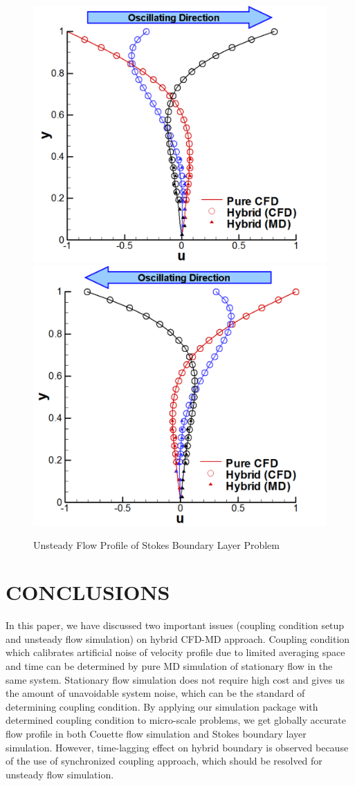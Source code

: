 \documentclass{CFD2010paper}
\begin{document}
%
\begin{figure}[ht]
\centering
\includegraphics[width=0.4\linewidth]{Stokes_Sol_1.pdf}
\hskip 1cm
\includegraphics[width=0.4\linewidth]{Stokes_Sol_2.pdf}
\vskip-0.2cm
\caption{Unsteady Flow Profile of Stokes Boundary Layer Problem}
\label{Stokes_Sol}
\end{figure}



\section{CONCLUSIONS}

In this paper, we have discussed two important issues (coupling condition setup and unsteady flow simulation) on hybrid CFD-MD approach. Coupling condition which calibrates artificial noise of velocity profile due to limited averaging space and time can be determined by pure MD simulation of stationary flow in the same system. Stationary flow simulation does not require high cost and gives us the amount of unavoidable system noise, which can be the standard of determining coupling condition. By applying our simulation package with determined coupling condition to micro-scale problems, we get globally accurate flow profile in both Couette flow simulation and Stokes boundary layer simulation. However, time-lagging effect on hybrid boundary is observed because of the use of synchronized coupling approach, which should be resolved for unsteady flow simulation.

\end{document}
